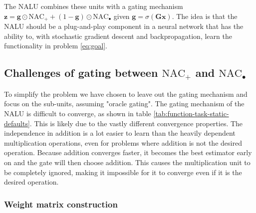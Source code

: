 The NALU combines these units with a gating mechanism $\mathbf{z} = \mathbf{g} \odot \text{NAC}_{+} + (1 - \mathbf{g}) \odot \text{NAC}_{\bullet}$ given $\mathbf{g} = \sigma(\mathbf{G} \mathbf{x})$. The idea is that the NALU should be a plug-and-play component in a neural network that has the ability to, with stochastic gradient descent and backpropagation, learn the functionality in problem \ref{eq:goal}.

\subsection{Challenges of gating between $\text{NAC}_{+}$ and $\text{NAC}_{\bullet}$}
\label{sec:methods:gatting-issue}
To simplify the problem we have chosen to leave out the gating mechanism and focus on the sub-units, assuming "oracle gating". The gating mechanism of the NALU is difficult to converge, as shown in table \ref{tab:function-task-static-defaults}. This is likely due to the vastly different convergence properties. The independence in addition is a lot easier to learn than the heavily dependent multiplication operations, even for problems where addition is not the desired operation. Because addition converges faster, it becomes the best estimator early on and the gate will then choose addition. This causes the multiplication unit to be completely ignored, making it impossible for it to converge even if it is the desired operation.





\subsubsection{Weight matrix construction}\label{sssec:weight}


